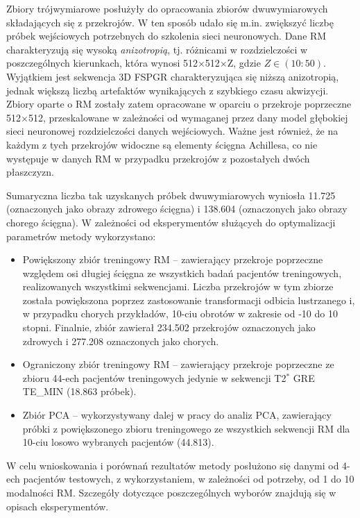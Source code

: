 Zbiory trójwymiarowe posłużyły do opracowania zbiorów dwuwymiarowych składających się z przekrojów. W ten sposób udało się m.in. zwiększyć liczbę próbek wejściowych potrzebnych do szkolenia sieci neuronowych. Dane RM charakteryzują się wysoką \textit{anizotropią}, tj. różnicami w rozdzielczości w poszczególnych kierunkach, która wynosi 512$\times$512$\times$Z, gdzie $Z\in(10:50)$. Wyjątkiem jest sekwencja 3D FSPGR charakteryzująca się niższą anizotropią, jednak większą liczbą artefaktów wynikających z szybkiego czasu akwizycji. Zbiory oparte o RM zostały zatem opracowane w oparciu o przekroje poprzeczne 512$\times$512, przeskalowane w zależności od wymaganej przez dany model głębokiej sieci neuronowej rozdzielczości danych wejściowych. Ważne jest również, że na każdym z tych przekrojów widoczne są elementy ścięgna Achillesa, co nie występuje w danych RM w przypadku przekrojów z pozostałych dwóch płaszczyzn.

Sumaryczna liczba tak uzyskanych próbek dwuwymiarowych wyniosła 11.725 (oznaczonych jako obrazy zdrowego ścięgna) i 138.604 (oznaczonych jako obrazy chorego ścięgna). W zależności od eksperymentów służących do optymalizacji parametrów metody wykorzystano:
\begin{itemize}[noitemsep,nolistsep]
	\item Powiększony zbiór treningowy RM -- zawierający przekroje poprzeczne względem osi długiej ścięgna ze wszystkich badań pacjentów treningowych, realizowanych wszystkimi sekwencjami. Liczba przekrojów w tym zbiorze została powiększona poprzez zastosowanie transformacji odbicia lustrzanego i, w przypadku chorych przykładów, 10-ciu obrotów w zakresie od -10 do 10 stopni. Finalnie, zbiór zawierał 234.502 przekrojów oznaczonych jako zdrowych i 277.208 oznaczonych jako chorych.
	\item Ograniczony zbiór treningowy RM -- zawierający przekroje poprzeczne ze zbioru 44-ech pacjentów treningowych jedynie w sekwencji T2$^\ast$ GRE TE\_MIN (18.863 próbek).
	\item Zbiór PCA -- wykorzystywany dalej w pracy do analiz PCA, zawierający próbki z powiększonego zbioru treningowego ze wszystkich sekwencji RM dla 10-ciu losowo wybranych pacjentów (44.813).
\end{itemize}

W celu wnioskowania i porównań rezultatów metody posłużono się danymi \linebreak od 4-ech pacjentów testowych, z wykorzystaniem, w zależności od potrzeby, od 1 do 10 modalności RM. Szczegóły dotyczące poszczególnych wyborów znajdują się \linebreak w opisach eksperymentów.


